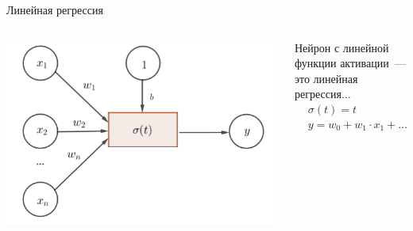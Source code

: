 \documentclass[notes,12pt, aspectratio=169]{beamer}
\begin{document}
\begin{frame}{Линейная регрессия}
\begin{columns}[T] 
	\begin{column}{.45\textwidth}
		\begin{center}
			\includegraphics[width=0.99\linewidth]{neuron_3.png}
		\end{center}
	\end{column}%
	\hfill%
	\begin{column}{.55\textwidth}
		Нейрон с линейной функции активации~—   это линейная регрессия... 
		\begin{equation*}
		\begin{aligned}
		& \sigma(t) = t \\
		& y= w_0 + w_1 \cdot x_1 + \ldots + w_n \cdot x_n \\
		\end{aligned}
		\end{equation*}
	\end{column}%
\end{columns}
\end{frame}
\end{document}
